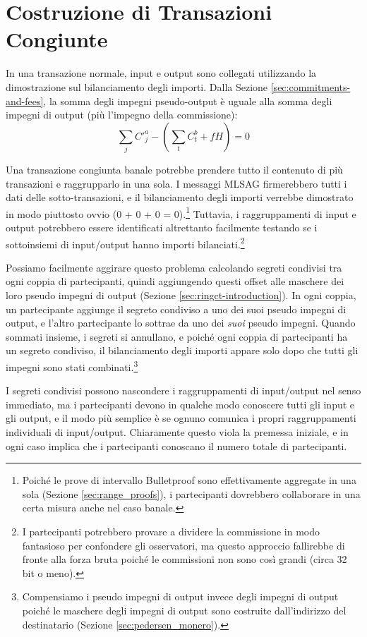 \section{Costruzione di Transazioni Congiunte}
\label{sec:building-txtangle}

In una transazione normale, input e output sono collegati utilizzando la dimostrazione sul bilanciamento degli importi. Dalla Sezione \ref{sec:commitments-and-fees}, la somma degli impegni pseudo-output è uguale alla somma degli impegni di output (più l'impegno della commissione):\vspace{0.175cm}
\[\sum_j C'^a_{j} - (\sum_t C^b_{t} + f H) = 0\]

Una transazione congiunta banale potrebbe prendere tutto il contenuto di più transazioni e raggrupparlo in una sola. I messaggi MLSAG firmerebbero tutti i dati delle sotto-transazioni, e il bilanciamento degli importi verrebbe dimostrato in modo piuttosto ovvio (0 + 0 + 0 = 0).\footnote{Poiché le prove di intervallo Bulletproof sono effettivamente aggregate in una sola (Sezione \ref{sec:range_proofs}), i partecipanti dovrebbero collaborare in una certa misura anche nel caso banale.} Tuttavia, i raggruppamenti di input e output potrebbero essere identificati altrettanto facilmente testando se i sottoinsiemi di input/output hanno importi bilanciati.\footnote{I partecipanti potrebbero provare a dividere la commissione in modo fantasioso per confondere gli osservatori, ma questo approccio fallirebbe di fronte alla forza bruta poiché le commissioni non sono così grandi (circa 32 bit o meno).}

Possiamo facilmente aggirare questo problema calcolando segreti condivisi tra ogni coppia di partecipanti, quindi aggiungendo questi offset alle maschere dei loro pseudo impegni di output (Sezione \ref{sec:ringct-introduction}). In ogni coppia, un partecipante aggiunge il segreto condiviso a uno dei suoi pseudo impegni di output, e l'altro partecipante lo sottrae da uno dei \emph{suoi} pseudo impegni. Quando sommati insieme, i segreti si annullano, e poiché ogni coppia di partecipanti ha un segreto condiviso, il bilanciamento degli importi appare solo dopo che tutti gli impegni sono stati combinati.\footnote{Compensiamo i pseudo impegni di output invece degli impegni di output poiché le maschere degli impegni di output sono costruite dall'indirizzo del destinatario (Sezione \ref{sec:pedersen_monero}).}

I segreti condivisi possono nascondere i raggruppamenti di input/output nel senso immediato, ma i partecipanti devono in qualche modo conoscere tutti gli input e gli output, e il modo più semplice è se ognuno comunica i propri raggruppamenti individuali di input/output. Chiaramente questo viola la premessa iniziale, e in ogni caso implica che i partecipanti conoscano il numero totale di partecipanti.


